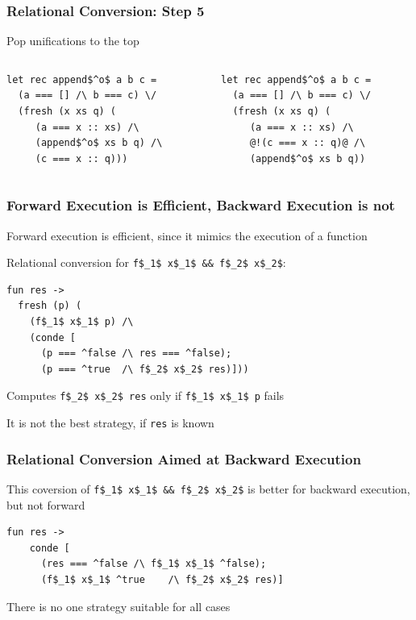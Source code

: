 \documentclass[xcolor=table]{beamer}
\begin{document}
\begin{frame}[fragile]
  \transwipe[direction=90]
  \frametitle{Relational Conversion: Step 5}
  
Pop unifications to the top

\begin{columns}
\begin{column}{0.5\textwidth}
\begin{lstlisting}
let rec append$^o$ a b c =
  (a === [] /\ b === c) \/
  (fresh (x xs q) (
     (a === x :: xs) /\
     (append$^o$ xs b q) /\
     (c === x :: q)))
\end{lstlisting}
\end{column}
\begin{column}{0.5\textwidth}  
\begin{lstlisting}
let rec append$^o$ a b c =
  (a === [] /\ b === c) \/
  (fresh (x xs q) (
     (a === x :: xs) /\
     @!(c === x :: q)@ /\
     (append$^o$ xs b q))
\end{lstlisting}
\end{column}
\end{columns}
\end{frame}


\begin{frame}[fragile]
  \transwipe[direction=90]
  \frametitle{Forward Execution is Efficient, Backward Execution is not}
  
  Forward execution is efficient, since it mimics the execution of a function
  
\vspace{6pt}  
  
Relational conversion for \lstinline{f$_1$ x$_1$ && f$_2$ x$_2$}: 
 
\begin{lstlisting}
fun res ->
  fresh (p) (
    (f$_1$ x$_1$ p) /\
    (conde [
      (p === ^false /\ res === ^false);
      (p === ^true  /\ f$_2$ x$_2$ res)]))
\end{lstlisting} 

Computes \lstinline{f$_2$ x$_2$ res} only if \lstinline{f$_1$ x$_1$ p} fails

\vspace{6pt}

It is not the best strategy, if \lstinline{res} is known

\end{frame}

\begin{frame}[fragile]
  \transwipe[direction=90]
  \frametitle{Relational Conversion Aimed at Backward Execution}

This coversion of  \lstinline{f$_1$ x$_1$ && f$_2$ x$_2$} is better for backward execution, but not forward

\begin{lstlisting}
fun res ->
    conde [
      (res === ^false /\ f$_1$ x$_1$ ^false);
      (f$_1$ x$_1$ ^true    /\ f$_2$ x$_2$ res)]
\end{lstlisting}


  There is no one strategy suitable for all cases
\end{frame}
\end{document}
